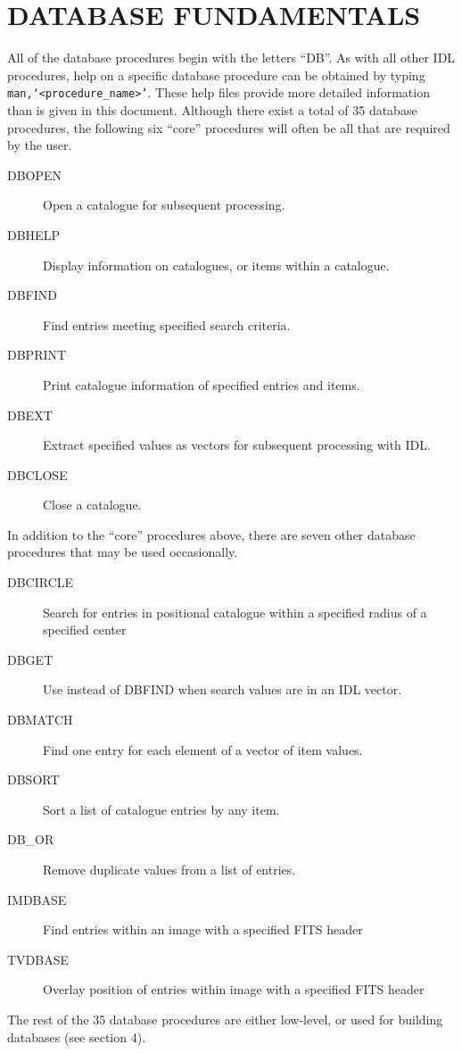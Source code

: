 \section{DATABASE FUNDAMENTALS}
All of the database procedures begin with the letters ``DB''.  
As with all other IDL procedures,
help on a specific database procedure can be obtained by typing
{\tt man,`$<$procedure\_name$>$'}.  These help files provide more detailed information
than is given in this document.
Although there exist a total of 35 database procedures,
the following
six ``core'' procedures will often be all that are required by the user.
\begin{description}
\item[DBOPEN] Open a catalogue for subsequent processing.
\item[DBHELP] Display information on catalogues, or items within a catalogue.
\item[DBFIND] Find entries meeting specified search criteria.
\item[DBPRINT] Print catalogue information of specified entries and items.
\item[DBEXT] Extract specified values as vectors for subsequent processing
with IDL.
\item[DBCLOSE] Close a catalogue.
\end{description}
In addition to the ``core'' procedures above, there are seven other database 
procedures that may be used occasionally.
\begin{description}
\item[DBCIRCLE] Search for entries in positional catalogue within a specified 
              radius of a specified center
\item[DBGET] Use instead of DBFIND when search values are in an IDL vector.
\item[DBMATCH] Find one entry for each element of a vector of item values.
\item[DBSORT] Sort a list of catalogue entries by any item.
\item[DB\_OR] Remove duplicate values from a list of entries.
\item[IMDBASE] Find entries within an image with a specified FITS header
\item[TVDBASE] Overlay position of entries within image with a specified FITS
header
\end{description}
  
The rest of the 35 database procedures are either low-level, or used for
building databases (see section 4).

